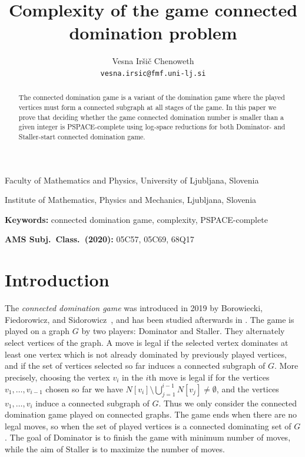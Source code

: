 \documentclass[12pt]{article}
\begin{document}
\title{Complexity of the game connected domination problem}

\author{Vesna Ir\v si\v c Chenoweth\\ \texttt{vesna.irsic@fmf.uni-lj.si}}
\maketitle

\begin{center}
Faculty of Mathematics and Physics, University of Ljubljana, Slovenia\\
\medskip

Institute of Mathematics, Physics and Mechanics, Ljubljana, Slovenia\\
\medskip
\end{center}

\begin{abstract}
The connected domination game is a variant of the domination game where the played vertices must form a connected subgraph at all stages of the game. In this paper we prove that deciding whether the game connected domination number is smaller than a given integer is PSPACE-complete using log-space reductions for both Dominator- and Staller-start connected domination game.
\end{abstract}

\noindent
{\bf Keywords:} connected domination game, complexity, PSPACE-complete

\noindent
{\bf AMS Subj.\ Class.\ (2020):} 05C57, 05C69, 68Q17

\section{Introduction}
\label{sec:intro}

The \emph{connected domination game} was introduced in 2019 by Borowiecki, Fiedorowicz, and Sidorowicz~\cite{borowiecki+2019connected}, and has been studied afterwards in \cite{bujtas+2019connected, bujtas+2021connected, irsic2019+connected}. The game is played on a graph $G$ by two players: Dominator and Staller. They alternately select vertices of the graph. A move is legal if the selected vertex dominates at least one vertex which is not already dominated by previously played vertices, and if the set of vertices selected so far induces a connected subgraph of $G$. More precisely, choosing the vertex $v_i$ in the $i$th move is legal if for the vertices $v_1,\ldots,v_{i-1}$ chosen so far we have $N[v_i] \setminus \bigcup_{j=1}^{i-1}N[v_j]\not=\emptyset$, and the vertices $v_1, \ldots, v_i$ induce a connected subgraph of $G$.
Thus we only consider the connected domination game played on connected graphs. The game ends when there are no legal moves, so when the set of played vertices is a connected dominating set of $G$. The goal of Dominator is to finish the game with minimum number of moves, while the aim of Staller is to maximize the number of moves.
\end{document}
